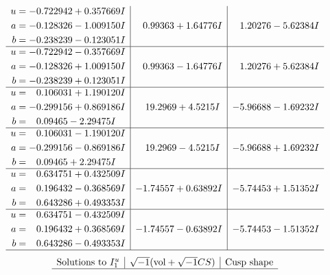 \documentclass[1p]{elsarticle_modified}
\theoremstyle{definition}
\newcommand{\I}{\sqrt{-1}}
\begin{document}
$$\begin{array}{c|c|c}
\begin{aligned}
u &= -0.722942 + 0.357669 I \\
a &= -0.128326 - 1.009150 I \\
b &= -0.238239 - 0.123051 I\end{aligned}
 & \phantom{-}0.99363 + 1.64776 I & \phantom{-}1.20276 - 5.62384 I \\ \hline\begin{aligned}
u &= -0.722942 - 0.357669 I \\
a &= -0.128326 + 1.009150 I \\
b &= -0.238239 + 0.123051 I\end{aligned}
 & \phantom{-}0.99363 - 1.64776 I & \phantom{-}1.20276 + 5.62384 I \\ \hline\begin{aligned}
u &= \phantom{-}0.106031 + 1.190120 I \\
a &= -0.299156 + 0.869186 I \\
b &= \phantom{-}0.09465 - 2.29475 I\end{aligned}
 & \phantom{-}19.2969 + 4.5215 I & -5.96688 - 1.69232 I \\ \hline\begin{aligned}
u &= \phantom{-}0.106031 - 1.190120 I \\
a &= -0.299156 - 0.869186 I \\
b &= \phantom{-}0.09465 + 2.29475 I\end{aligned}
 & \phantom{-}19.2969 - 4.5215 I & -5.96688 + 1.69232 I \\ \hline\begin{aligned}
u &= \phantom{-}0.634751 + 0.432509 I \\
a &= \phantom{-}0.196432 - 0.368569 I \\
b &= \phantom{-}0.643286 + 0.493353 I\end{aligned}
 & -1.74557 + 0.63892 I & -5.74453 + 1.51352 I \\ \hline\begin{aligned}
u &= \phantom{-}0.634751 - 0.432509 I \\
a &= \phantom{-}0.196432 + 0.368569 I \\
b &= \phantom{-}0.643286 - 0.493353 I\end{aligned}
 & -1.74557 - 0.63892 I & -5.74453 - 1.51352 I\\
 \hline 
 \end{array}$$\newpage$$\begin{array}{c|c|c}  
\text{Solutions to }I^u_{1}& \I (\text{vol} + \sqrt{-1}CS) & \text{Cusp shape}\\
 \hline 

\end{array}$$
\end{document}
